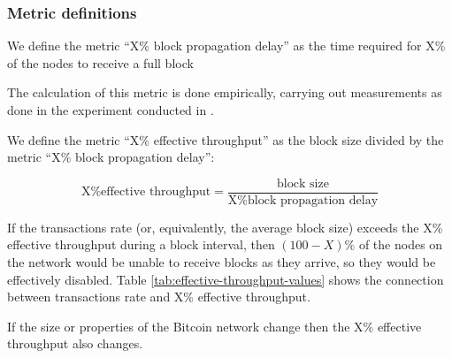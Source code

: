 \subsubsection{Metric definitions}
\begin{definition}
  We define the metric ``X\% block propagation delay'' as the time required for
  X\% of the nodes to receive a full block
\end{definition}
\begin{remark}
  The calculation of this metric is done empirically, carrying out measurements
  as done in the experiment conducted in \cite{croman-scaling-blockchain}.
\end{remark}

\begin{definition}\label{def:effective-throughput}
  We define the metric ``X\% effective throughput'' as the block size divided by
  the metric ``X\% block propagation delay'':

  \[\text{X\% effective throughput} = \frac{\text{block size}}{\text{X\% block
  propagation delay}}\]
\end{definition}

\begin{remark}\label{remark-1}
  If the transactions rate (or, equivalently, the average block size) exceeds
  the X\% effective throughput during a block interval, then $(100-X)\%$
  of the nodes on the network would be unable to receive blocks as they arrive,
  so they would be effectively disabled. Table \ref{tab:effective-throughput-values}
  shows the connection between transactions rate and X\% effective throughput.
\end{remark}

\begin{remark}
  If the size or properties of the Bitcoin network change then the X\% effective
  throughput also changes.
\end{remark}

\begin{table}[h!]
\centering
{}
\caption{Effective throughputs and associated transactions per second. The values
are calculated assuming that 50\% and 90\% block propagation times are 8.7 seconds
and 79 seconds respectively, while the average block size is 540KB and the
transactions are 250-byte transactions. Note that the effective throughput
values are expressed in kilo-bits per second.}
\label{tab:effective-throughput-values}
\end{table}




